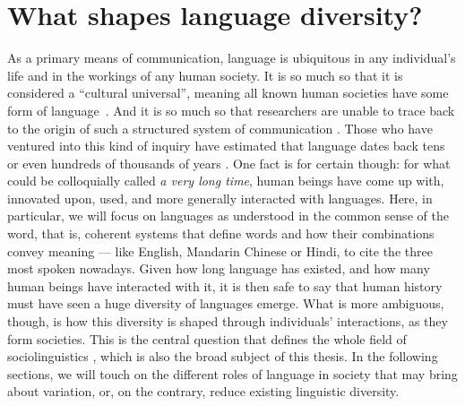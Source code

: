 \documentclass[../thesis.tex]{subfiles}
\begin{document}
\chapter{What shapes language diversity?}
\label{ch:origins_lang_diversity}
 
As a primary means of communication, language is ubiquitous in any individual's life and
in the workings of any human society. It is so much so that it is considered a
``cultural universal'', meaning all known human societies have some form of
language~\cite{GreenbergLanguageUniversals2020,BrownDonaldHumanUniversals1991,}. And it
is so much so that researchers are unable to trace back to the origin of such a
structured system of communication
\cite{MullerLectureIX1861,StamInquiriesOrigin1976,GibsonOxfordHandbook2011,HauserMysteryLanguage2014}.
Those who have ventured into this kind of inquiry have estimated that language dates
back tens or even hundreds of thousands of years
\cite{NicholsOriginDispersal1998,ChomskyLanguageMind2004,BothaCradleLanguage2009,DediuAntiquityLanguage2013}.
One fact is for certain though: for what could be colloquially called \emph{a very long
time}, human beings have come up with, innovated upon, used, and more generally
interacted with languages. Here, in particular, we will focus on languages as understood
in the common sense of the word, that is, coherent systems that define words and how
their combinations convey meaning --- like English, Mandarin Chinese or Hindi, to cite
the three most spoken nowadays. Given how long language has existed, and how many human
beings have interacted with it, it is then safe to say that human history must have seen
a huge diversity of languages emerge. What is more ambiguous, though, is how this
diversity is shaped through individuals' interactions, as they form societies. This is
the central question that defines the whole field of sociolinguistics
\cite{LabovSociolinguisticPatterns1973,TrudgillSociolinguisticsIntroduction2000,ChambersSociolinguisticTheory2007,WardhaughIntroductionSociolinguistics2008,LabovPrinciplesLinguistic2001},
which is also the broad subject of this thesis. In the following sections, we will touch
on the different roles of language in society that may bring about variation, or, on the
contrary, reduce existing linguistic diversity.

\end{document}
